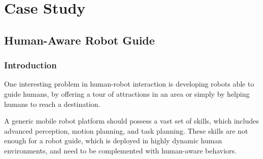 
\chapter{Case Study} %

\label{chapter-case_study} %




\section{Human-Aware Robot Guide}
\subsection{Introduction}
One interesting problem in human-robot interaction is developing robots able to guide humans, by offering a tour of attractions in an area or simply by helping humans to reach a destination.

A generic mobile robot platform should possess a vast set of skills, which includes advanced perception, motion planning, and task planning. These skills are not enough for a robot guide, which is deployed in highly dynamic human environments, and need to be complemented with human-aware behaviors.

